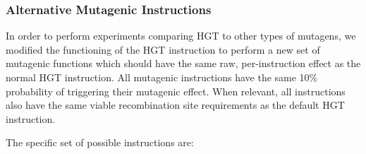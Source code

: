 \documentclass[PhD]{msu-thesis}
\begin{document}
\subsubsection{Alternative Mutagenic Instructions}
In order to perform experiments comparing HGT to other types of mutagens, we modified the functioning of the HGT instruction to perform a new set of mutagenic functions which should have the same raw, per-instruction effect as the normal HGT instruction.
All mutagenic instructions have the same 10\% probability of triggering their mutagenic effect.  When relevant, all instructions also have the same viable recombination site requirements as the default HGT instruction.

The specific set of possible instructions are:
\end{document}
